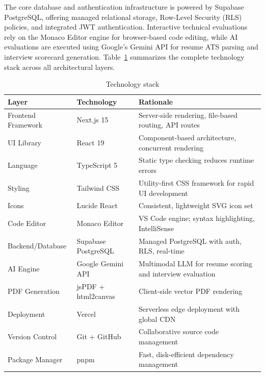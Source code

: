The core database and authentication infrastructure is powered by Supabase PostgreSQL, offering managed relational storage, Row-Level Security (RLS) policies, and integrated JWT authentication. Interactive technical evaluations rely on the Monaco Editor engine for browser-based code editing, while AI evaluations are executed using Google's Gemini API for resume ATS parsing and interview scorecard generation. Table~\ref{tab:techstack} summarizes the complete technology stack across all architectural layers.

\begin{table}[htbp]
\centering
\caption{Technology stack}
\label{tab:techstack}
\small
\begin{tabular}{p{1.6in}p{1.2in}p{2.8in}}
\toprule
\textbf{Layer}       & \textbf{Technology}    & \textbf{Rationale} \\
\midrule
Frontend Framework   & Next.js 15             & Server-side rendering, file-based routing, API routes \\
UI Library           & React 19               & Component-based architecture, concurrent rendering \\
Language             & TypeScript 5           & Static type checking reduces runtime errors \\
Styling              & Tailwind CSS           & Utility-first CSS framework for rapid UI development \\
Icons                & Lucide React           & Consistent, lightweight SVG icon set \\
Code Editor          & Monaco Editor          & VS Code engine; syntax highlighting, IntelliSense \\
Backend/Database     & Supabase PostgreSQL    & Managed PostgreSQL with auth, RLS, real-time \\
AI Engine            & Google Gemini API      & Multimodal LLM for resume scoring and interview evaluation \\
PDF Generation       & jsPDF + html2canvas    & Client-side vector PDF rendering \\
Deployment           & Vercel                 & Serverless edge deployment with global CDN \\
Version Control      & Git + GitHub           & Collaborative source code management \\
Package Manager      & pnpm                   & Fast, disk-efficient dependency management \\
\bottomrule
\end{tabular}
\end{table}

